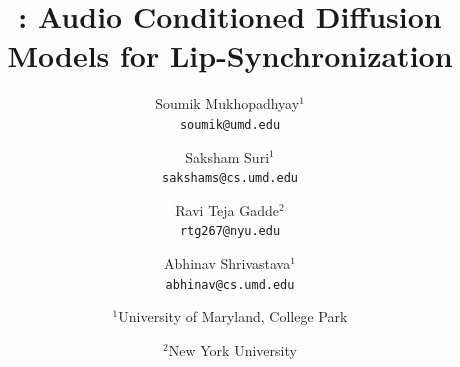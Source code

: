 \documentclass[10pt,twocolumn,letterpaper]{article}
\begin{document}
\title{\ours : Audio Conditioned Diffusion Models for Lip-Synchronization}



\author{Soumik Mukhopadhyay$^1$\\
{\tt\small soumik@umd.edu}
\and
Saksham Suri$^1$\\
{\tt\small sakshams@cs.umd.edu}
\and
Ravi Teja Gadde$^2$\\
{\tt\small rtg267@nyu.edu}
\and
Abhinav Shrivastava$^1$\\
{\tt\small abhinav@cs.umd.edu}
\and
$^1$University of Maryland, College Park\\
\and 
$^2$New York University
}


\ificcvfinal\thispagestyle{empty}\fi

\ificcvfinal\pagestyle{empty}\fi

\newcommand{\methodname}{Diff2Lip}
\newcommand{\ours}{\methodname}












\maketitle





















{\small


}

\clearpage
\appendix

\end{document}
